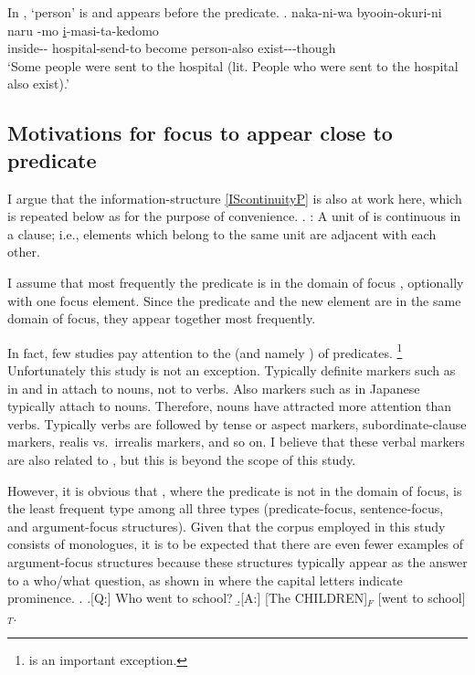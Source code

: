 In \Next,
 `person' is  and appears before the predicate.
\exg. naka-ni-wa byooin-okuri-ni naru -mo \ul{i}-masi-ta-kedomo \\
		inside-- hospital-send-to become person-also exist---though \\
		`Some people were sent to the hospital (lit. People who were sent to the hospital also exist).'


\subsection{Motivations for focus to appear close to predicate}\label{WO:PreP:Motivation}

I argue that the information-structure  \ref{IScontinuityP} is also at work here, which is repeated below as \Next for the purpose of convenience.
%
\ex. \label{IScontinuityP2}:
 A unit of  is continuous in a clause;
 i.e., elements which belong to the same unit are adjacent with each other.

I assume that
most frequently the predicate is in the domain of focus \cite{lambrecht94},
optionally with one focus element.
Since the predicate and the new element are in the same domain of focus,
they appear together most frequently.

In fact, few studies pay attention to the  (and namely ) of predicates.%
	\footnote{
	 is an important exception.
	}
Unfortunately this study is not an exception.
Typically definite markers such as  in  and  in  attach to nouns, not to verbs.
Also  markers such as  in Japanese typically attach to nouns.
Therefore, nouns have attracted more attention than verbs.
Typically verbs are followed by tense or aspect markers, subordinate-clause markers, realis vs.\ irrealis markers, and so on.
I believe that these verbal markers are also related to ,
but this is beyond the scope of this study.

However,
it is obvious that ,
where the predicate is not in the domain of focus,
is the least frequent type among all three types (predicate-focus, sentence-focus, and argument-focus structures).
Given that the corpus employed in this study consists of monologues, it is to be expected that there are even fewer examples of argument-focus structures because these structures typically appear as the answer to a who/what question, as shown in \Next where the capital letters indicate prominence.
%
\ex.
 \a.[Q:] Who went to school?
 \b.[A:] [The CHILDREN]$_{F}$ [went to school]$_{T}$.
 \hfill{\cite[][121]{lambrecht94}}

